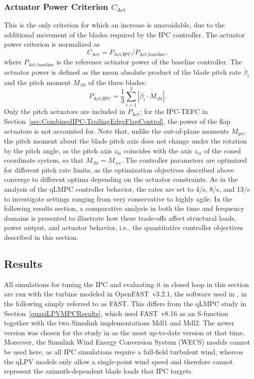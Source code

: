 \subsubsection*{Actuator Power Criterion $C_{\text{Act}}$}
This is the only criterion for which an increase is unavoidable, due to the additional movement of the blades required by the IPC controller. The actuator power criterion is normalized as
\begin{equation} \label{eq:CAct}
    C_{\text{Act}} = P_{\text{Act}, \text{IPC}}/P_{\text{Act}, \text{baseline}},
\end{equation}
where \( P_{\text{Act}, \text{baseline}} \) is the reference actuator power of the baseline controller. The actuator power is defined as the mean absolute product of the blade pitch rate $\dot{\beta}_i$ and the pitch moment $M_{zbi}$ of the three blades:
\begin{equation} \label{eq:CAct_calc}
    P_{\text{Act}, \text{IPC}} = \frac{1}{3} \sum_{i=1}^3 \overline{|\dot{\beta}_i \cdot M_{zbi}|}.
\end{equation}
Only the pitch actuators are included in $P_{\text{Act}}$; for the IPC-TEFC in Section~\ref{sec:CombinedIPC-TrailingEdgeFlapControl}, the power of the flap actuators is not accounted for.
%
Note that, unlike the out-of-plane moments $M_{yci}$, the pitch moment about the blade pitch axis does not change under the rotation by the pitch angle, as the pitch axis $z_{bi}$ coincides with the axis $z_{ci}$ of the coned coordinate system, so that $M_{zbi} = M_{zci}$.
The controller parameters are optimized for different pitch rate limits, as the optimization objectives described above converge to different optima depending on the actuator constraints. As in the analysis of the qLMPC controller behavior, the rates are set to 4\textdegree/s, 8\textdegree/s, and 13\textdegree/s to investigate settings ranging from very conservative to highly agile. In the following results section, a comparative analysis in both the time and frequency domains is presented to illustrate how these trade-offs affect structural loads, power output, and actuator behavior, i.e., the quantitative controller objectives described in this section.

\subsection{Results} \label{subsection: IPCResults}
All simulations for tuning the IPC and evaluating it in closed loop in this section are run with the turbine modeled in OpenFAST~v3.2.1, the software used in \cite{dittmer2024combined}, in the following simply referred to as FAST. This differs from the qLMPC study in Section~\ref{quasiLPVMPCResults}, which used FAST~v8.16 as an S-function together with the two Simulink implementations Mdl1 and Mdl2. The newer version was chosen for the study in \cite{dittmer2024combined} as the most up-to-date version at that time. Moreover, the Simulink Wind Energy Conversion System (WECS) models cannot be used here, as all IPC simulations require a full-field turbulent wind, whereas the qLPV models only allow a single-point wind speed and therefore cannot represent the azimuth-dependent blade loads that IPC targets.

